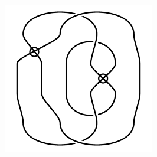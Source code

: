 \begin{figure}[H]
\begin{minipage}[b]{.18\linewidth}
\end{minipage}
\begin{minipage}[b]{.18\linewidth}
\centering
\includegraphics[width=\linewidth]{../data/virtual_4_56.png}
\end{minipage}
\end{figure}

